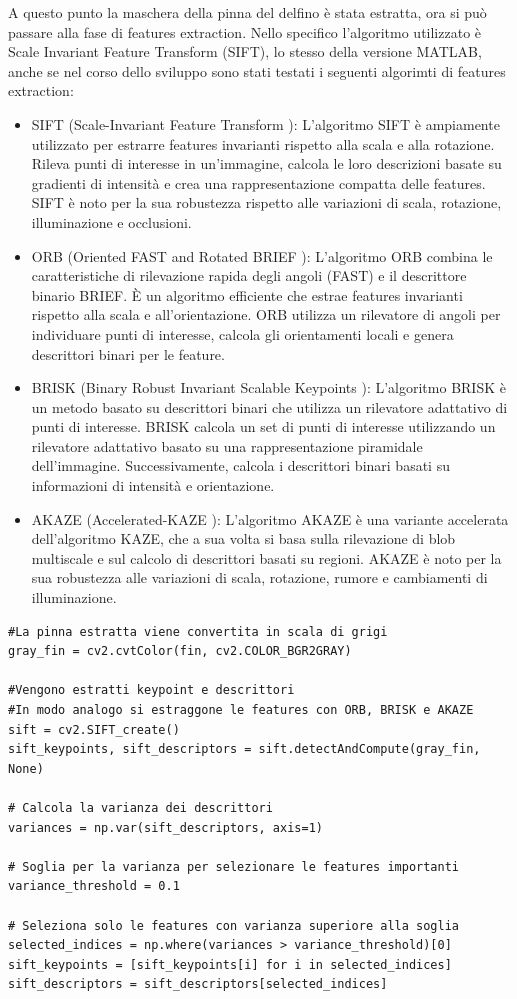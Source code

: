 \documentclass[a4paper,12pt]{report}
\begin{document}
    A questo punto la maschera della pinna del delfino è stata estratta, 
    ora si può passare alla fase di features extraction. Nello specifico l'algoritmo utilizzato 
    è Scale Invariant Feature Transform (SIFT), lo stesso della versione MATLAB,
    anche se nel corso dello sviluppo sono stati testati i seguenti algorimti di features extraction:
    \begin{itemize}
      \item SIFT (Scale-Invariant Feature Transform \cite{lowe2004distinctive}): L'algoritmo SIFT è ampiamente utilizzato per estrarre features invarianti rispetto alla scala e alla rotazione. Rileva punti di interesse in un'immagine, calcola le loro descrizioni basate su gradienti di intensità e crea una rappresentazione compatta delle features. SIFT è noto per la sua robustezza rispetto alle variazioni di scala, rotazione, illuminazione e occlusioni.
      \item ORB (Oriented FAST and Rotated BRIEF \cite{rublee2011orb}): L'algoritmo ORB combina le caratteristiche di rilevazione rapida degli angoli (FAST) e il descrittore binario BRIEF. È un algoritmo efficiente che estrae features invarianti rispetto alla scala e all'orientazione. ORB utilizza un rilevatore di angoli per individuare punti di interesse, calcola gli orientamenti locali e genera descrittori binari per le feature.
      \newpage
      \item BRISK (Binary Robust Invariant Scalable Keypoints \cite{leutenegger2011brisk}): L'algoritmo BRISK è un metodo basato su descrittori binari che utilizza un rilevatore adattativo di punti di interesse. BRISK calcola un set di punti di interesse utilizzando un rilevatore adattativo basato su una rappresentazione piramidale dell'immagine. Successivamente, calcola i descrittori binari basati su informazioni di intensità e orientazione.
      \item AKAZE (Accelerated-KAZE \cite{alcantarilla2012fast}): L'algoritmo AKAZE è una variante accelerata dell'algoritmo KAZE, che a sua volta si basa sulla rilevazione di blob multiscale e sul calcolo di descrittori basati su regioni. AKAZE è noto per la sua robustezza alle variazioni di scala, rotazione, rumore e cambiamenti di illuminazione.
    \end{itemize}
\begin{lstlisting}
#La pinna estratta viene convertita in scala di grigi
gray_fin = cv2.cvtColor(fin, cv2.COLOR_BGR2GRAY)

#Vengono estratti keypoint e descrittori
#In modo analogo si estraggone le features con ORB, BRISK e AKAZE
sift = cv2.SIFT_create()
sift_keypoints, sift_descriptors = sift.detectAndCompute(gray_fin, None)

# Calcola la varianza dei descrittori
variances = np.var(sift_descriptors, axis=1)

# Soglia per la varianza per selezionare le features importanti
variance_threshold = 0.1

# Seleziona solo le features con varianza superiore alla soglia
selected_indices = np.where(variances > variance_threshold)[0]
sift_keypoints = [sift_keypoints[i] for i in selected_indices]
sift_descriptors = sift_descriptors[selected_indices]
\end{lstlisting}
\end{document}
